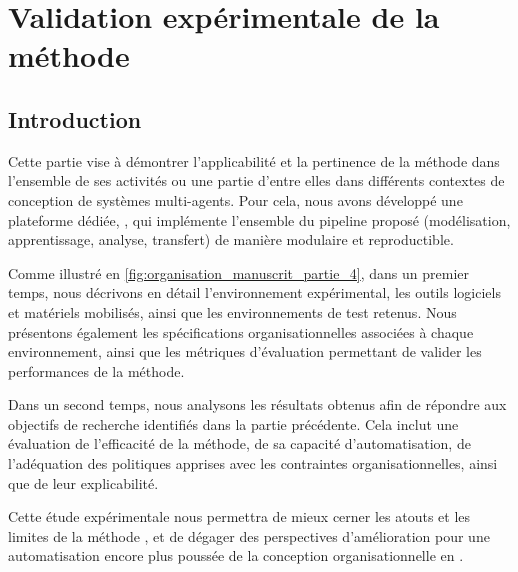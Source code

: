 \clearpage
\thispagestyle{empty}
\null
\newpage

\cleardoublepage
{}
\part{Validation expérimentale de la méthode}
\label{part:experimentation}

\clearpage
\thispagestyle{empty}
\null
\newpage

\chapter*{Introduction}

\noindent
Cette partie vise à démontrer l'applicabilité et la pertinence de la méthode  dans l'ensemble de ses activités ou une partie d'entre elles dans différents contextes de conception de systèmes multi-agents. Pour cela, nous avons développé une plateforme dédiée, , qui implémente l'ensemble du pipeline proposé (modélisation, apprentissage, analyse, transfert) de manière modulaire et reproductible.

\medskip

\noindent
Comme illustré en \autoref{fig:organisation_manuscrit_partie_4}, dans un premier temps, nous décrivons en détail l'environnement expérimental, les outils logiciels et matériels mobilisés, ainsi que les environnements de test retenus. Nous présentons également les spécifications organisationnelles associées à chaque environnement, ainsi que les métriques d'évaluation permettant de valider les performances de la méthode.

\medskip

\noindent
Dans un second temps, nous analysons les résultats obtenus afin de répondre aux objectifs de recherche identifiés dans la partie précédente. Cela inclut une évaluation de l'efficacité de la méthode, de sa capacité d'automatisation, de l'adéquation des politiques apprises avec les contraintes organisationnelles, ainsi que de leur explicabilité.

\medskip

\noindent
Cette étude expérimentale nous permettra de mieux cerner les atouts et les limites de la méthode , et de dégager des perspectives d'amélioration pour une automatisation encore plus poussée de la conception organisationnelle en .



